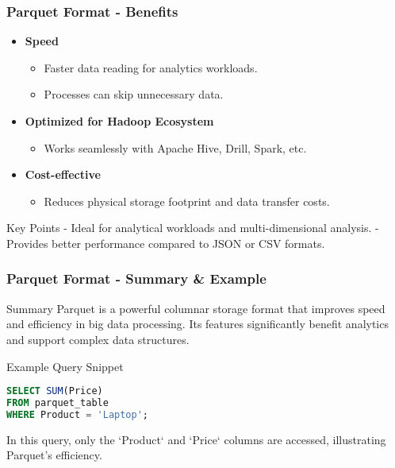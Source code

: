 \documentclass[aspectratio=169]{beamer}
\begin{document}
\begin{frame}[fragile]
    \frametitle{Parquet Format - Benefits}
    \begin{itemize}
        \item \textbf{Speed} 
        \begin{itemize}
            \item Faster data reading for analytics workloads.
            \item Processes can skip unnecessary data.
        \end{itemize}

        \item \textbf{Optimized for Hadoop Ecosystem} 
        \begin{itemize}
            \item Works seamlessly with Apache Hive, Drill, Spark, etc.
        \end{itemize}

        \item \textbf{Cost-effective}
        \begin{itemize}
            \item Reduces physical storage footprint and data transfer costs.
        \end{itemize}
    \end{itemize}

    \begin{block}{Key Points}
        - Ideal for analytical workloads and multi-dimensional analysis.
        - Provides better performance compared to JSON or CSV formats.
    \end{block}
\end{frame}

\begin{frame}[fragile]
    \frametitle{Parquet Format - Summary & Example}
    \begin{block}{Summary}
        Parquet is a powerful columnar storage format that improves speed and efficiency in big data processing. Its features significantly benefit analytics and support complex data structures.
    \end{block}

    \begin{block}{Example Query Snippet}
    \begin{lstlisting}[language=SQL]
SELECT SUM(Price)
FROM parquet_table
WHERE Product = 'Laptop';
    \end{lstlisting}
    In this query, only the `Product` and `Price` columns are accessed, illustrating Parquet's efficiency.
    \end{block}
\end{frame}
\end{document}
